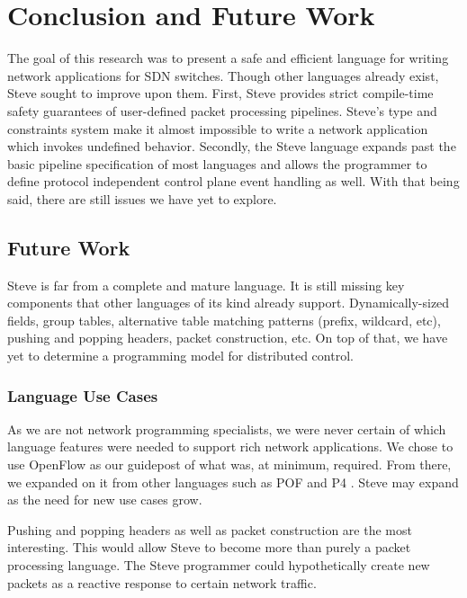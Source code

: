 \chapter{Conclusion and Future Work} \label{ch:conclusion}

The goal of this research was to present a safe and efficient language for writing network applications for SDN switches. Though other languages already exist, Steve sought to improve upon them. First, Steve provides strict compile-time safety guarantees of user-defined packet processing pipelines.
Steve's type and constraints system make it almost impossible to write a network application which invokes undefined behavior.
Secondly, the Steve language expands past the basic pipeline specification of most languages and allows the programmer to define protocol independent control plane event handling as well. With that being said, there are still issues we have yet to explore.

\section{Future Work}

Steve is far from a complete and mature language. It is still missing key components that other languages of its kind already support. Dynamically-sized fields, group tables, alternative table matching patterns (prefix, wildcard, etc), pushing and popping headers, packet construction, etc. On top of that, we have yet to determine a programming model for distributed control.

\subsection{Language Use Cases}

As we are not network programming specialists, we were never certain of which language features were needed to support rich network applications. We chose to use OpenFlow \cite{openflow_spec} as our guidepost of what was, at minimum, required. From there, we expanded on it from other languages such as POF \cite{pof, pof_fis, pof_impl} and P4 \cite{pof, p42014, p4_spec}. Steve may expand as the need for new use cases grow.

Pushing and popping headers as well as packet construction are the most interesting. This would allow Steve to become more than purely a packet processing language. The Steve programmer could hypothetically create new packets as a reactive response to certain network traffic.

